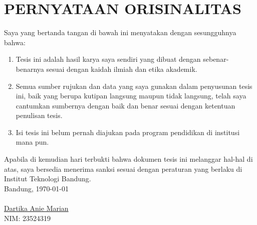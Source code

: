\chapter*{PERNYATAAN ORISINALITAS}
\vspace{2cm}
Saya yang bertanda tangan di bawah ini menyatakan dengan sesungguhnya bahwa:
\begin{enumerate}
    \item Tesis ini adalah hasil karya saya sendiri yang dibuat dengan sebenar-benarnya sesuai dengan kaidah ilmiah dan etika akademik.
    \item Semua sumber rujukan dan data yang saya gunakan dalam penyusunan tesis ini, baik yang berupa kutipan langsung maupun tidak langsung, telah saya cantumkan sumbernya dengan baik dan benar sesuai dengan ketentuan penulisan tesis.
    \item Isi tesis ini belum pernah diajukan pada program pendidikan di institusi mana pun.
\end{enumerate}
Apabila di kemudian hari terbukti bahwa dokumen tesis ini melanggar hal-hal di atas, saya bersedia menerima sanksi sesuai dengan peraturan yang berlaku di Institut Teknologi Bandung.
\\[2cm]
Bandung, \today\\
\\[2cm]

\underline{Dartika Anie Marian} \\
NIM: 23524319
  